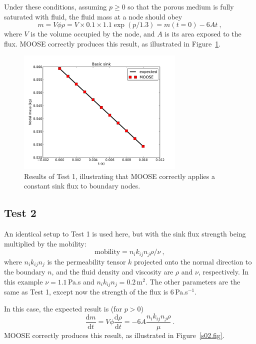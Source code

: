 \documentclass[]{scrreprt}
\def\d{\mathrm{d}}
\begin{document}
Under these conditions, assuming $p\geq 0$ so that the porous medium
is fully saturated with fluid, the fluid mass at a node should obey
\begin{equation}
m = V\phi\rho = V\times0.1\times 1.1\exp(p/1.3) = m(t=0) - 6At \ ,
\end{equation}
where $V$ is the volume occupied by the node, and $A$ is its area
exposed to the flux.  MOOSE correctly produces this result, as
illustrated in Figure~\ref{s01.fig}.

\begin{figure}[htb]
\begin{center}
\includegraphics[width=8cm]{s01.pdf}
\caption{Results of Test 1, illustrating that MOOSE correctly applies
  a constant sink flux to boundary nodes.}
\label{s01.fig}
\end{center}
\end{figure}

\subsection{Test 2}

An identical setup to Test 1 is used here, but with the sink flux
strength being multiplied by the mobility:
\begin{equation}
\mbox{mobility} = n_{i}k_{ij}n_{j}\rho/\nu \ ,
\end{equation}
where $n_{i}k_{ij}n_{j}$ is the permeability tensor $k$ projected onto
the normal direction to the boundary $n$, and the fluid density and
viscosity are $\rho$ and $\nu$, respectively.  In this example
$\nu=1.1$\,Pa.s and $n_{i}k_{ij}n_{j}=0.2$\,m$^{2}$.  The other
parameters are the same as Test 1, except now the strength of the flux
is 6\,Pa.s$^{-1}$.

In this case, the expected result is (for $p>0$)
\begin{equation}
\frac{\d m}{\d t} = V\phi \frac{\d \rho}{\d t} = -6 A
\frac{n_{i}k_{ij}n_{j}\rho}{\mu} \ .
\end{equation}
MOOSE correctly produces this result, as illustrated in
Figure~\ref{s02.fig}.
\end{document}
